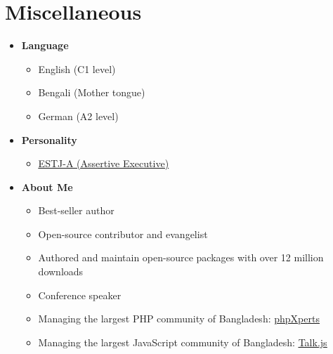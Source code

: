 \documentclass[a4paper,11pt]{article}
\newcommand{\resumeSubItem}[1]{\item#1\vspace{-4pt}}
\newcommand{\resumeSubHeadingListStart}{\begin{itemize}[leftmargin=0.15in, label={}]}
\newcommand{\resumeSubHeadingListEnd}{\end{itemize}}
\newcommand{\resumeItemListStart}{\begin{itemize}}
\newcommand{\resumeItemListEnd}{\end{itemize}\vspace{-5pt}}
\newcommand{\resumeItem}[1]{
    \item\small{
        {#1 \vspace{-2pt}}
    }
}
\begin{document}
\section{Miscellaneous}
    \resumeSubHeadingListStart
        \resumeSubItem{\textbf{Language}}
            \resumeItemListStart
                \resumeItem{English (C1 level)}
                \resumeItem{Bengali (Mother tongue)}
                \resumeItem{German (A2 level)}
            \resumeItemListEnd

        \resumeSubItem{\textbf{Personality}}
            \resumeItemListStart
                \resumeItem{\href{https://www.16personalities.com/profiles/3db6b8e4630d9}{\underline{ESTJ-A (Assertive Executive)}}}
            \resumeItemListEnd
        
        \resumeSubItem{\textbf{About Me}}
            \resumeItemListStart
                \resumeItem{Best-seller author}
                \resumeItem{Open-source contributor and evangelist}
                \resumeItem{Authored and maintain open-source packages with over 12 million downloads}
                \resumeItem{Conference speaker}
                \resumeItem{Managing the largest PHP community of Bangladesh: \href{https://web.facebook.com/groups/pxperts}{\underline{phpXperts}}}
                \resumeItem{Managing the largest JavaScript community of Bangladesh: \href{https://www.facebook.com/groups/talkjs.net}{\underline{Talk.js}}}
            \resumeItemListEnd
    \resumeSubHeadingListEnd

\end{document}
